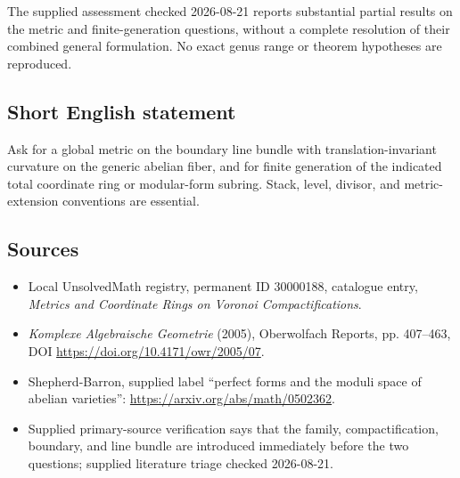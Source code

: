 \documentclass[11pt]{article}
\begin{document}
The supplied assessment checked 2026-08-21 reports substantial partial results on the metric and finite-generation questions, without a complete resolution of their combined general formulation. No exact genus range or theorem hypotheses are reproduced.
\subsection{Short English statement}
Ask for a global metric on the boundary line bundle with translation-invariant curvature on the generic abelian fiber, and for finite generation of the indicated total coordinate ring or modular-form subring. Stack, level, divisor, and metric-extension conventions are essential.
\subsection{Sources}
\begin{itemize}
\item Local UnsolvedMath registry, permanent ID 30000188, catalogue entry, \emph{Metrics and Coordinate Rings on Voronoi Compactifications}.
\item \emph{Komplexe Algebraische Geometrie} (2005), Oberwolfach Reports, pp. 407--463, DOI \url{https://doi.org/10.4171/owr/2005/07}.
\item Shepherd-Barron, supplied label ``perfect forms and the moduli space of abelian varieties'': \url{https://arxiv.org/abs/math/0502362}.
\item Supplied primary-source verification says that the family, compactification, boundary, and line bundle are introduced immediately before the two questions; supplied literature triage checked 2026-08-21.
\end{itemize}
\end{document}
